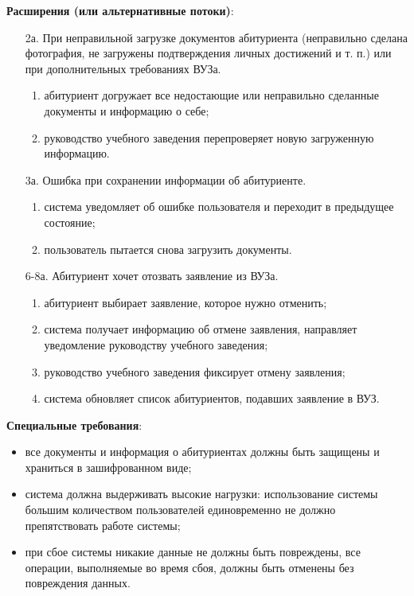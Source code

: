 \documentclass[a4paper, 14pt]{extarticle}
\begin{document}
{  \textbf{Расширения (или альтернативные потоки)}:
  \begin{enumerate}
    \item[2а.] При неправильной загрузке документов абитуриента (неправильно сделана
      фотография, не загружены подтверждения личных достижений и т. п.) или при
      дополнительных требованиях ВУЗа.
      \begin{enumerate}
        \item абитуриент догружает все недостающие или неправильно сделанные
        документы и информацию о себе;
        \item руководство учебного заведения перепроверяет новую загруженную
        информацию.
      \end{enumerate}
    \item[3а.] Ошибка при сохранении информации об абитуриенте.
      \begin{enumerate}
        \item система уведомляет об ошибке пользователя и переходит в предыдущее
        состояние;
        \item пользователь пытается снова загрузить документы.
      \end{enumerate}
    \item[6-8а.] Абитуриент хочет отозвать заявление из ВУЗа.
      \begin{enumerate}
        \item абитуриент выбирает заявление, которое нужно отменить;
        \item система получает информацию об отмене заявления, направляет
        уведомление руководству учебного заведения;
        \item руководство учебного заведения фиксирует отмену заявления;
        \item система обновляет список абитуриентов, подавших заявление в ВУЗ.
      \end{enumerate}
  \end{enumerate}

  \textbf{Специальные требования}:
  \begin{itemize}
    \item все документы и информация о абитуриентах должны быть защищены и
    храниться в зашифрованном виде;
    \item система должна выдерживать высокие нагрузки: использование системы
    большим количеством пользователей единовременно не должно препятствовать
    работе системы;
    \item при сбое системы никакие данные не должны быть повреждены, все
    операции, выполняемые во время сбоя, должны быть отменены без повреждения
    данных.
  \end{itemize}

}
\end{document}
